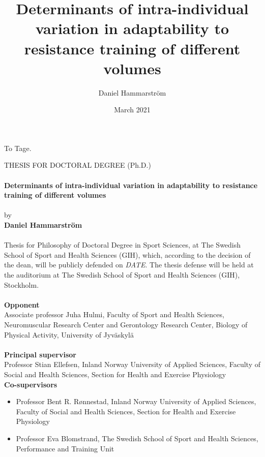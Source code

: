 \documentclass[twoside,10pt]{gihclass} %
\title{Determinants of intra-individual variation in adaptability to resistance training of different volumes}
\author{Daniel Hammarström}
\date{March 2021}
\begin{document}


\frontmatter %
  \maketitle
  \begin{dedication}
\vspace*{\fill}
 To Tage.
\vspace*{\fill}
  \end{dedication}
\begin{defence}
    THESIS FOR DOCTORAL DEGREE (Ph.D.)\\
    ~\\
    \textbf{Determinants of intra-individual variation in adaptability to resistance training of different volumes}\\
    ~\\
    by\\
    \textbf{Daniel Hammarström}\\
    ~\\
    Thesis for Philosophy of Doctoral Degree in Sport Sciences, at The Swedish School of Sport and Health Sciences (GIH), which, according to the decision of the dean, will be publicly defended on \emph{DATE}. The thesis defense will be held at the auditorium at The Swedish School of Sport and Health Sciences (GIH), Stockholm.\\
    ~\\
    \textbf{Opponent}\\
    Associate professor Juha Hulmi, Faculty of Sport and Health Sciences, Neuromuscular Research Center and Gerontology Research Center, Biology of Physical Activity, University of Jyväskylä\\
    ~\\
    \textbf{Principal supervisor}\\
    Professor Stian Ellefsen, Inland Norway University of Applied Sciences, Faculty of Social and Health Sciences, Section for Health and Exercise Physiology\\
    \textbf{Co-supervisors}
    \begin{itemize}
    \item
      Professor Bent R. Rønnestad, Inland Norway University of Applied Sciences, Faculty of Social and Health Sciences, Section for Health and Exercise Physiology
    \item
      Professor Eva Blomstrand, The Swedish School of Sport and Health Sciences, Performance and Training Unit\\

\end{itemize}
\end{defence}
\end{document}

